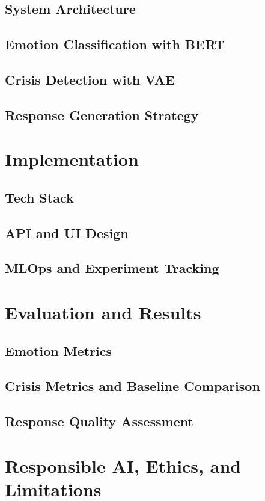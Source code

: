 \documentclass[11pt,a4paper]{article}
\begin{document}
\subsection{System Architecture}
\subsection{Emotion Classification with BERT}
\subsection{Crisis Detection with VAE}
\subsection{Response Generation Strategy}

\section{Implementation}
\subsection{Tech Stack}
\subsection{API and UI Design}
\subsection{MLOps and Experiment Tracking}

\section{Evaluation and Results}
\subsection{Emotion Metrics}
\subsection{Crisis Metrics and Baseline Comparison}
\subsection{Response Quality Assessment}

\section{Responsible AI, Ethics, and Limitations}
\end{document}

